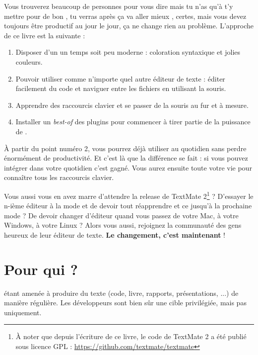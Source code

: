 Vous trouverez beaucoup de personnes pour vous dire \og mais tu n'as qu'à t'y mettre pour de bon \fg, \og tu verras après ça va aller mieux \fg, certes, mais vous devez toujours être productif au jour le jour, ça ne change rien au problème. L'approche de ce livre est la suivante :

\begin{enumerate}
    \item Disposer d'un \vim un temps soit peu moderne : coloration syntaxique et jolies couleurs.
    \item Pouvoir utiliser \vim comme n'importe quel autre éditeur de texte : éditer facilement du code et naviguer entre les fichiers en utilisant la souris.
    \item Apprendre des raccourcis clavier et se passer de la souris au fur et à mesure.
    \item Installer un \emph{best-of} des plugins pour commencer à tirer partie de la puissance de \vim.
\end{enumerate}

À partir du point numéro 2, vous pourrez déjà utiliser \vim au quotidien sans perdre énormément de productivité. Et c'est là que la différence se fait : si vous pouvez intégrer \vim dans votre quotidien c'est gagné. Vous aurez ensuite toute votre vie pour connaître tous les raccourcis clavier.

Vous aussi vous en avez marre d'attendre la release de TextMate 2\footnote{À noter que depuis l'écriture de ce livre, le code de TextMate 2 a été publié sous licence GPL : \url{https://github.com/textmate/textmate}} ? D'essayer le n-ième éditeur à la mode et de devoir tout réapprendre et ce jusqu'à la prochaine mode ? De devoir changer d'éditeur quand vous passez de votre Mac, à votre Windows, à votre Linux ? Alors vous aussi, rejoignez la communauté des gens heureux de leur éditeur de texte. \textbf{Le changement, c'est maintenant} !

\section{Pour qui ?}

 étant amenée à produire du texte (code, livre, rapports, présentations, ...) de manière régulière. Les développeurs sont bien sûr une cible privilégiée, mais pas uniquement.

